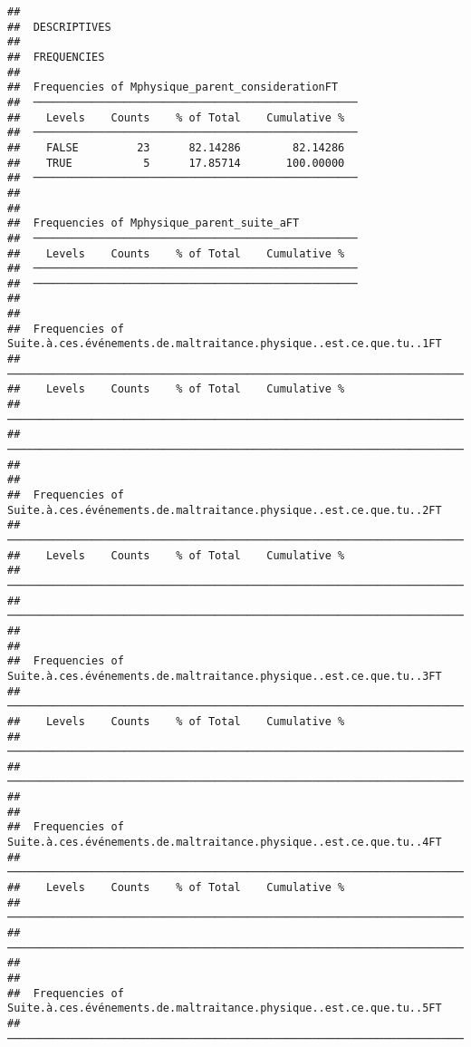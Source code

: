 \documentclass[
]{article}
\begin{document}
\begin{verbatim}
## 
##  DESCRIPTIVES
## 
##  FREQUENCIES
## 
##  Frequencies of Mphysique_parent_considerationFT    
##  ────────────────────────────────────────────────── 
##    Levels    Counts    % of Total    Cumulative %   
##  ────────────────────────────────────────────────── 
##    FALSE         23      82.14286        82.14286   
##    TRUE           5      17.85714       100.00000   
##  ────────────────────────────────────────────────── 
## 
## 
##  Frequencies of Mphysique_parent_suite_aFT          
##  ────────────────────────────────────────────────── 
##    Levels    Counts    % of Total    Cumulative %   
##  ────────────────────────────────────────────────── 
##  ────────────────────────────────────────────────── 
## 
## 
##  Frequencies of Suite.à.ces.événements.de.maltraitance.physique..est.ce.que.tu..1FT 
##  ────────────────────────────────────────────────────────────────────────────────── 
##    Levels    Counts    % of Total    Cumulative %   
##  ────────────────────────────────────────────────────────────────────────────────── 
##  ────────────────────────────────────────────────────────────────────────────────── 
## 
## 
##  Frequencies of Suite.à.ces.événements.de.maltraitance.physique..est.ce.que.tu..2FT 
##  ────────────────────────────────────────────────────────────────────────────────── 
##    Levels    Counts    % of Total    Cumulative %   
##  ────────────────────────────────────────────────────────────────────────────────── 
##  ────────────────────────────────────────────────────────────────────────────────── 
## 
## 
##  Frequencies of Suite.à.ces.événements.de.maltraitance.physique..est.ce.que.tu..3FT 
##  ────────────────────────────────────────────────────────────────────────────────── 
##    Levels    Counts    % of Total    Cumulative %   
##  ────────────────────────────────────────────────────────────────────────────────── 
##  ────────────────────────────────────────────────────────────────────────────────── 
## 
## 
##  Frequencies of Suite.à.ces.événements.de.maltraitance.physique..est.ce.que.tu..4FT 
##  ────────────────────────────────────────────────────────────────────────────────── 
##    Levels    Counts    % of Total    Cumulative %   
##  ────────────────────────────────────────────────────────────────────────────────── 
##  ────────────────────────────────────────────────────────────────────────────────── 
## 
## 
##  Frequencies of Suite.à.ces.événements.de.maltraitance.physique..est.ce.que.tu..5FT 
##  ────────────────────────────────────────────────────────────────────────────────── 

\end{verbatim}
\end{document}
